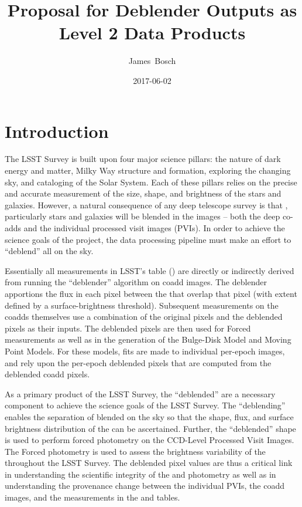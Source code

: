 \documentclass[DM,toc]{lsstdoc}
\title[Deblender Data Products]{Proposal for Deblender Outputs as Level 2 Data Products}
\author{
James~Bosch
}
\date{2017-06-02}
\begin{document}
\maketitle

\section{Introduction}
The LSST Survey is built upon four major science pillars: the nature of dark energy and matter, Milky Way structure and formation, exploring the changing sky, and cataloging of the Solar System.  Each of these pillars relies on the precise and accurate measurement of the size, shape, and brightness of the stars and galaxies.  However, a natural consequence of any deep telescope survey is that \Objects, particularly stars and galaxies will be blended in the images -- both the deep co-adds and the individual processed visit images (PVIs).  In order to achieve the science goals of the project, the data processing pipeline must make an effort to ``deblend'' all \Objects on the sky.

Essentially all measurements in LSST's \Object table (\DPDD) are directly or indirectly derived from running the ``deblender'' algorithm on coadd images.  The deblender apportions the flux in each pixel between the \Objects that overlap that pixel (with \Object extent defined by a surface-brightness threshold).  Subsequent measurements on the coadds themselves use a combination of the original pixels and the deblended pixels as their inputs.  The deblended pixels are then used for Forced \Source measurements as well as in the generation of the Bulge-Disk Model and Moving Point \Source Models.  For these models, fits are made to individual per-epoch images, and rely upon the per-epoch deblended pixels that are computed from the deblended coadd pixels.

As a primary product of the LSST Survey, the ``deblended'' \Objects are a necessary component to achieve the science goals of the LSST Survey.  The ``deblending'' enables the separation of blended \Objects on the sky so that the shape, flux, and surface brightness distribution of the \Objects can be ascertained.  Further, the ``deblended'' shape is used to perform forced photometry on the CCD-Level Processed Visit Images.  The Forced \Source photometry is used to assess the brightness variability of the \Objects throughout the LSST Survey.  The deblended pixel values are thus a critical link in understanding the scientific integrity of the \Object and \ForcedSource photometry as well as in understanding the provenance change between the individual PVIs, the coadd images, and the measurements in the \Object and \ForcedSource tables.
\end{document}
